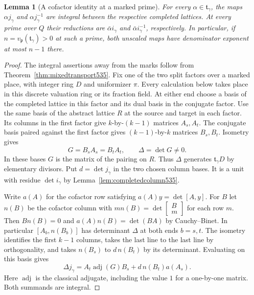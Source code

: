 \documentclass[a4paper,11pt]{article}
\newtheorem{lemma}[proposition]{Lemma}
\theoremstyle{definition}
\theoremstyle{remark}
\numberwithin{equation}{section}
\begin{document}
\begin{lemma}[A cofactor identity at a marked prime]
\leavevmode\label{lem:cofactormark581}
For every \(\alpha\in\mathfrak t_\gamma\), the maps
\(\alpha j_\gamma\) and \(\alpha j_\gamma^{-1}\) are integral
between the respective completed lattices. At every prime over
\(Q\) their reductions are \(\bar\alpha i_\gamma\) and
\(\bar\alpha i_\gamma^{-1}\), respectively. In particular, if
\(n=v_{\mathfrak p}(\mathfrak t_\gamma)>0\) at such a prime,
both unscaled maps have denominator exponent at most \(n-1\)
there.
\end{lemma}
\begin{proof}
The integral assertions away from the marks follow from
Theorem~\ref{thm:mixedtransport535}. Fix one of the two split
factors over a marked place, with integer ring \(D\) and
uniformizer \(\pi\). Every calculation below takes place in this
discrete valuation ring or its fraction field. At either end choose a basis of the
completed lattice in this factor and its dual basis in the
conjugate factor. Use the same basis of the abstract lattice
\(R\) at the source and target in each factor. Its columns in
the first factor give \(k\)-by-\((k-1)\) matrices \(A_s,A_t\).
The conjugate basis paired against the first factor gives
\((k-1)\)-by-\(k\) matrices \(B_s,B_t\). Isometry gives
\[
   G=B_sA_s=B_tA_t,\qquad \Delta=\det G\ne0 .
\]
In these bases \(G\) is the matrix of the pairing on \(R\).
Thus \(\Delta\) generates \(\mathfrak t_\gamma D\) by elementary
divisors. Put \(d=\det j_\gamma\) in the two chosen column bases.
It is a unit with residue \(\det i_\gamma\) by
Lemma~\ref{lem:completedcolumn535}.

Write \(a(A)\) for the cofactor row satisfying
\(a(A)y=\det[A,y]\). For \(B\) let \(n(B)\) be the cofactor
column with \(m n(B)=\det\left[\begin{smallmatrix}B\\m\end{smallmatrix}\right]\)
for each row \(m\). Then \(B n(B)=0\) and
\(a(A)n(B)=\det(BA)\) by Cauchy--Binet. In particular
\([A_b,n(B_b)]\) has determinant \(\Delta\) at both ends
\(b=s,t\). The isometry identifies the first \(k-1\) columns,
takes the last line to the last line by orthogonality, and
takes \(n(B_s)\) to \(d\,n(B_t)\) by its determinant. Evaluating
on this basis gives
\begin{equation}\label{eq:cofactor581}
 \Delta j_\gamma
       = A_t\operatorname{adj}(G)B_s+d\,n(B_t)a(A_s).
\end{equation}
Here \(\operatorname{adj}\) is the classical adjugate, including
the value \(1\) for a one-by-one matrix. Both summands are integral.


\end{proof}
\end{document}
